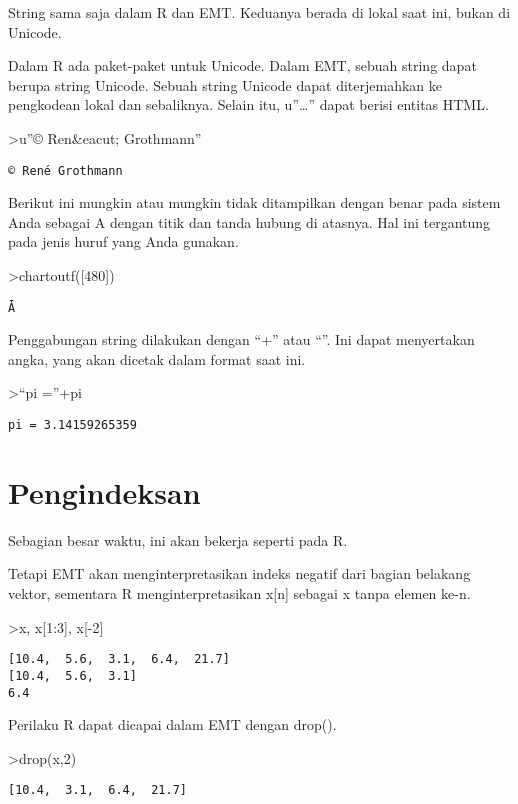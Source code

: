 \documentclass[
]{book}
\begin{document}
String sama saja dalam R dan EMT. Keduanya berada di lokal saat ini, bukan di Unicode.

Dalam R ada paket-paket untuk Unicode. Dalam EMT, sebuah string dapat berupa string Unicode. Sebuah string Unicode dapat diterjemahkan ke pengkodean lokal dan sebaliknya. Selain itu, u''\ldots'' dapat berisi entitas HTML.

\textgreater u''© Ren\&eacut; Grothmann''

\begin{verbatim}
© René Grothmann
\end{verbatim}

Berikut ini mungkin atau mungkin tidak ditampilkan dengan benar pada sistem Anda sebagai A dengan titik dan tanda hubung di atasnya. Hal ini tergantung pada jenis huruf yang Anda gunakan.

\textgreater chartoutf({[}480{]})

\begin{verbatim}
Ǡ
\end{verbatim}

Penggabungan string dilakukan dengan ``+'' atau ``\textbar{}''. Ini dapat menyertakan angka, yang akan dicetak dalam format saat ini.

\textgreater{}``pi =''+pi

\begin{verbatim}
pi = 3.14159265359
\end{verbatim}

\chapter{Pengindeksan}\label{pengindeksan}

Sebagian besar waktu, ini akan bekerja seperti pada R.

Tetapi EMT akan menginterpretasikan indeks negatif dari bagian belakang vektor, sementara R menginterpretasikan x{[}n{]} sebagai x tanpa elemen ke-n.

\textgreater x, x{[}1:3{]}, x{[}-2{]}

\begin{verbatim}
[10.4,  5.6,  3.1,  6.4,  21.7]
[10.4,  5.6,  3.1]
6.4
\end{verbatim}

Perilaku R dapat dicapai dalam EMT dengan drop().

\textgreater drop(x,2)

\begin{verbatim}
[10.4,  3.1,  6.4,  21.7]
\end{verbatim}
\end{document}
